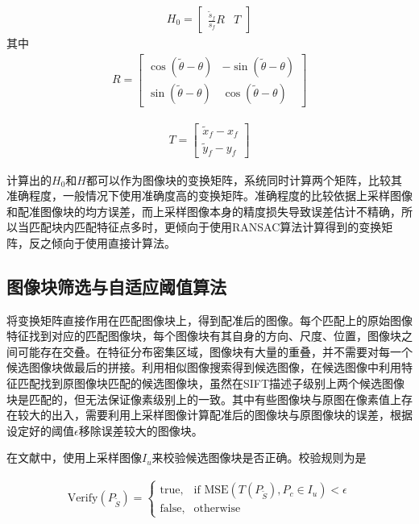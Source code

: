 \documentclass[UTF8]{csoarticle}
\begin{document}
\begin{align}
  H_0 = 
  \begin{bmatrix}
  \frac{\tilde{s}_f}{s_f} R & T
  \end{bmatrix}
\end{align}
其中
\begin{align}
  R = 
  \begin{bmatrix}
    \cos{(\tilde{\theta}-\theta)} & -\sin{(\tilde{\theta}-\theta)} \\
    \sin{(\tilde{\theta}-\theta)} & \cos{(\tilde{\theta}-\theta)} 
  \end{bmatrix}
\end{align}

\begin{align}
  T = 
  \begin{bmatrix}
    \tilde{x}_f - x_f \\
    \tilde{y}_f - y_f
  \end{bmatrix}
\end{align}

计算出的\(H_0\)和\(H\)都可以作为图像块的变换矩阵，系统同时计算两个矩阵，比较其准确程度，一般情况下使用准确度高的变换矩阵。准确程度的比较依据上采样图像和配准图像块的均方误差，而上采样图像本身的精度损失导致误差估计不精确，所以当匹配块内匹配特征点多时，更倾向于使用RANSAC算法计算得到的变换矩阵，反之倾向于使用直接计算法。

\subsection{图像块筛选与自适应阈值算法}
将变换矩阵直接作用在匹配图像块上，得到配准后的图像。每个匹配上的原始图像特征找到对应的匹配图像块，每个图像块有其自身的方向、尺度、位置，图像块之间可能存在交叠。在特征分布密集区域，图像块有大量的重叠，并不需要对每一个候选图像块做最后的拼接。利用相似图像搜索得到候选图像，在候选图像中利用特征匹配找到原图像块匹配的候选图像块，虽然在SIFT描述子级别上两个候选图像块是匹配的，但无法保证像素级别上的一致。其中有些图像块与原图在像素值上存在较大的出入，需要利用上采样图像计算配准后的图像块与原图像块的误差，根据设定好的阈值\(\epsilon\)移除误差较大的图像块。

在文献\cite{Dai:2012vn}中，使用上采样图像\(I_u\)来校验候选图像块是否正确。校验规则为是

\begin{align}
\label{eq:errorControl}
  \text{Verify}(P_{\tilde{S}}) = 
\begin{cases} 
\text{true}, & \mbox{if MSE} (T(P_{\tilde{S}}),P_c \in I_u) < \epsilon \\
\text{false}, & \mbox{otherwise}
\end{cases}
\end{align}
\end{document}

